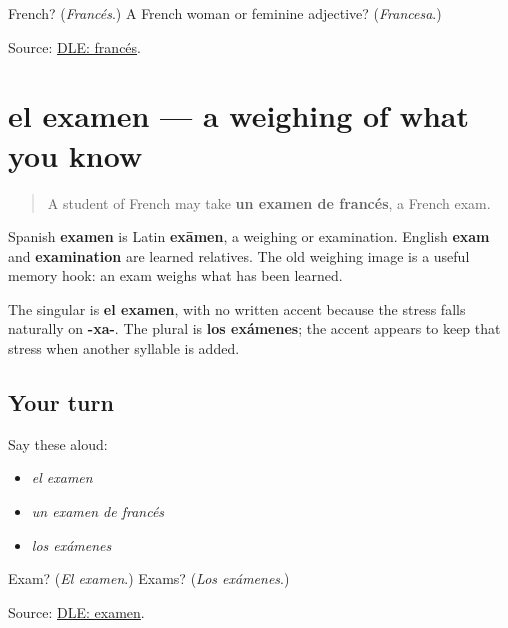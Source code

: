 \begin{tcolorbox}[breakable,colback=teal!4,colframe=teal!35!black,title={Before you move on}]
French? (\emph{Francés}.) A French woman or feminine adjective? (\emph{Francesa}.)

Source: \href{https://dle.rae.es/franc\%C3\%A9s}{DLE: francés}.
\end{tcolorbox}
\section[el examen]{el examen — a weighing of what you know}

\label{lesson:ES-C410-examen}



\begin{quote}
A student of French may take \textbf{un examen de francés}, a French exam.
\end{quote}

\begin{cousinweb}
Spanish \textbf{examen} is Latin \textbf{exāmen}, a weighing or examination. English \textbf{exam} and \textbf{examination} are learned relatives. The old weighing image is a useful memory hook: an exam weighs what has been learned.
\end{cousinweb}

\begin{grammarlens}[title={Grammar Lens: singular and plural stress}]
The singular is \textbf{el examen}, with no written accent because the stress falls naturally on \textbf{-xa-}. The plural is \textbf{los exámenes}; the accent appears to keep that stress when another syllable is added.
\end{grammarlens}

\subsection*{Your turn}
Say these aloud:

\begin{itemize}
\raggedright
  \item \emph{el examen}
  \item \emph{un examen de francés}
  \item \emph{los exámenes}
\end{itemize}

\begin{tcolorbox}[breakable,colback=teal!4,colframe=teal!35!black,title={Before you move on}]
Exam? (\emph{El examen}.) Exams? (\emph{Los exámenes}.)

Source: \href{https://dle.rae.es/examen}{DLE: examen}.
\end{tcolorbox}
